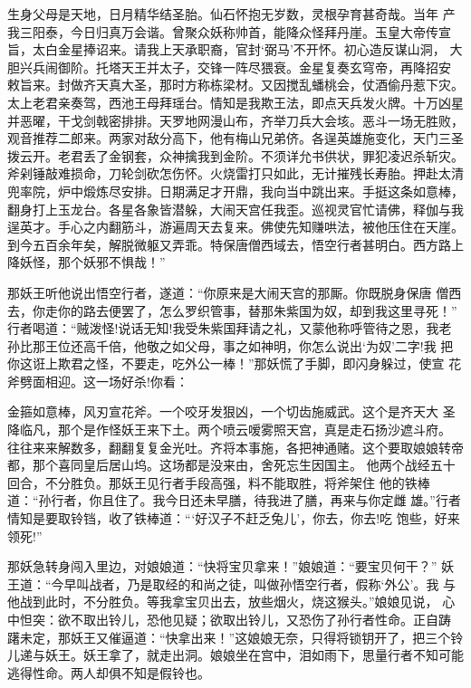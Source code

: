 生身父母是天地，日月精华结圣胎。仙石怀抱无岁数，灵根孕育甚奇哉。当年
产我三阳泰，今日归真万会谐。曾聚众妖称帅首，能降众怪拜丹崖。玉皇大帝传宣
旨，太白金星捧诏来。请我上天承职裔，官封‘弼马’不开怀。初心造反谋山洞，
大胆兴兵闹御阶。托塔天王并太子，交锋一阵尽猥衰。金星复奏玄穹帝，再降招安
敕旨来。封做齐天真大圣，那时方称栋梁材。又因搅乱蟠桃会，仗酒偷丹惹下灾。
太上老君亲奏驾，西池王母拜瑶台。情知是我欺王法，即点天兵发火牌。十万凶星
并恶曜，干戈剑戟密排排。天罗地网漫山布，齐举刀兵大会垓。恶斗一场无胜败，
观音推荐二郎来。两家对敌分高下，他有梅山兄弟侪。各逞英雄施变化，天门三圣
拨云开。老君丢了金钢套，众神擒我到金阶。不须详允书供状，罪犯凌迟杀斩灾。
斧剁锤敲难损命，刀轮剑砍怎伤怀。火烧雷打只如此，无计摧残长寿胎。押赴太清
兜率院，炉中煅炼尽安排。日期满足才开鼎，我向当中跳出来。手挺这条如意棒，
翻身打上玉龙台。各星各象皆潜躲，大闹天宫任我歪。巡视灵官忙请佛，释伽与我
逞英才。手心之内翻筋斗，游遍周天去复来。佛使先知赚哄法，被他压住在天崖。
到今五百余年矣，解脱微躯又弄乖。特保唐僧西域去，悟空行者甚明白。西方路上
降妖怪，那个妖邪不惧哉！”

那妖王听他说出悟空行者，遂道：“你原来是大闹天宫的那厮。你既脱身保唐
僧西去，你走你的路去便罢了，怎么罗织管事，替那朱紫国为奴，却到我这里寻死！”
行者喝道：“贼泼怪!说话无知!我受朱紫国拜请之礼，又蒙他称呼管待之恩，我老
孙比那王位还高千倍，他敬之如父母，事之如神明，你怎么说出‘为奴’二字!我
把你这诳上欺君之怪，不要走，吃外公一棒！”那妖慌了手脚，即闪身躲过，使宣
花斧劈面相迎。这一场好杀!你看：

金箍如意棒，风刃宣花斧。一个咬牙发狠凶，一个切齿施威武。这个是齐天大
圣降临凡，那个是作怪妖王来下土。两个喷云嗳雾照天宫，真是走石扬沙遮斗府。
往往来来解数多，翻翻复复金光吐。齐将本事施，各把神通赌。这个要取娘娘转帝
都，那个喜同皇后居山坞。这场都是没来由，舍死忘生因国主。
他两个战经五十回合，不分胜负。那妖王见行者手段高强，料不能取胜，将斧架住
他的铁棒道：“孙行者，你且住了。我今日还未早膳，待我进了膳，再来与你定雌
雄。”行者情知是要取铃铛，收了铁棒道：“‘好汉子不赶乏兔儿’，你去，你去!吃
饱些，好来领死!”

那妖急转身闯入里边，对娘娘道：“快将宝贝拿来！”娘娘道：“要宝贝何干？”
妖王道：“今早叫战者，乃是取经的和尚之徒，叫做孙悟空行者，假称‘外公’。我
与他战到此时，不分胜负。等我拿宝贝出去，放些烟火，烧这猴头。”娘娘见说，
心中怛突：欲不取出铃儿，恐他见疑；欲取出铃儿，又恐伤了孙行者性命。正自踌
躇未定，那妖王又催逼道：“快拿出来！”这娘娘无奈，只得将锁钥开了，把三个铃
儿递与妖王。妖王拿了，就走出洞。娘娘坐在宫中，泪如雨下，思量行者不知可能
逃得性命。两人却俱不知是假铃也。

